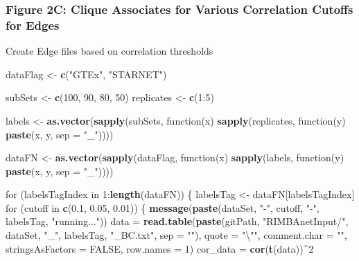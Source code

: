 \documentclass[]{article}
\newenvironment{Shaded}{\begin{snugshade}}{\end{snugshade}}
\newcommand{\KeywordTok}[1]{\textcolor[rgb]{0.13,0.29,0.53}{\textbf{{#1}}}}
\newcommand{\DataTypeTok}[1]{\textcolor[rgb]{0.13,0.29,0.53}{{#1}}}
\newcommand{\DecValTok}[1]{\textcolor[rgb]{0.00,0.00,0.81}{{#1}}}
\newcommand{\FloatTok}[1]{\textcolor[rgb]{0.00,0.00,0.81}{{#1}}}
\newcommand{\CharTok}[1]{\textcolor[rgb]{0.31,0.60,0.02}{{#1}}}
\newcommand{\StringTok}[1]{\textcolor[rgb]{0.31,0.60,0.02}{{#1}}}
\newcommand{\OtherTok}[1]{\textcolor[rgb]{0.56,0.35,0.01}{{#1}}}
\newcommand{\NormalTok}[1]{{#1}}
\begin{document}
\subsubsection{Figure 2C: Clique Associates for Various Correlation
Cutoffs for
Edges}\label{figure-2c-clique-associates-for-various-correlation-cutoffs-for-edges}

Create Edge files based on correlation thresholds

\begin{Shaded}
\begin{Highlighting}[]
\NormalTok{dataFlag <-}\StringTok{ }\KeywordTok{c}\NormalTok{(}\StringTok{"GTEx"}\NormalTok{, }\StringTok{"STARNET"}\NormalTok{)}

\NormalTok{subSets <-}\StringTok{ }\KeywordTok{c}\NormalTok{(}\DecValTok{100}\NormalTok{, }\DecValTok{90}\NormalTok{, }\DecValTok{80}\NormalTok{, }\DecValTok{50}\NormalTok{)}
\NormalTok{replicates <-}\StringTok{ }\KeywordTok{c}\NormalTok{(}\DecValTok{1}\NormalTok{:}\DecValTok{5}\NormalTok{)}

\NormalTok{labels <-}\StringTok{ }\KeywordTok{as.vector}\NormalTok{(}\KeywordTok{sapply}\NormalTok{(subSets, function(x) }\KeywordTok{sapply}\NormalTok{(replicates, }
    \NormalTok{function(y) }\KeywordTok{paste}\NormalTok{(x, y, }\DataTypeTok{sep =} \StringTok{"_"}\NormalTok{))))}

\NormalTok{dataFN <-}\StringTok{ }\KeywordTok{as.vector}\NormalTok{(}\KeywordTok{sapply}\NormalTok{(dataFlag, function(x) }\KeywordTok{sapply}\NormalTok{(labels, }
    \NormalTok{function(y) }\KeywordTok{paste}\NormalTok{(x, y, }\DataTypeTok{sep =} \StringTok{"_"}\NormalTok{))))}


\NormalTok{for (labelsTagIndex in }\DecValTok{1}\NormalTok{:}\KeywordTok{length}\NormalTok{(dataFN)) \{}
    \NormalTok{labelsTag <-}\StringTok{ }\NormalTok{dataFN[labelsTagIndex]}
    \NormalTok{for (cutoff in }\KeywordTok{c}\NormalTok{(}\FloatTok{0.1}\NormalTok{, }\FloatTok{0.05}\NormalTok{, }\FloatTok{0.01}\NormalTok{)) \{}
        \KeywordTok{message}\NormalTok{(}\KeywordTok{paste}\NormalTok{(dataSet, }\StringTok{"-"}\NormalTok{, cutoff, }\StringTok{"-"}\NormalTok{, labelsTag, }\StringTok{"running..."}\NormalTok{))}
        \NormalTok{data =}\StringTok{ }\KeywordTok{read.table}\NormalTok{(}\KeywordTok{paste}\NormalTok{(gitPath, }\StringTok{"RIMBAnetInput/"}\NormalTok{, dataSet, }
            \StringTok{"_"}\NormalTok{, labelsTag, }\StringTok{"_BC.txt"}\NormalTok{, }\DataTypeTok{sep =} \StringTok{""}\NormalTok{), }\DataTypeTok{quote =} \StringTok{"}\CharTok{\textbackslash{}"}\StringTok{"}\NormalTok{, }
            \DataTypeTok{comment.char =} \StringTok{""}\NormalTok{, }\DataTypeTok{stringsAsFactors =} \OtherTok{FALSE}\NormalTok{, }\DataTypeTok{row.names =} \DecValTok{1}\NormalTok{)}
        \NormalTok{cor_data =}\StringTok{ }\KeywordTok{cor}\NormalTok{(}\KeywordTok{t}\NormalTok{(data))^}\DecValTok{2}
        

\end{Highlighting}
\end{Shaded}
\end{document}
